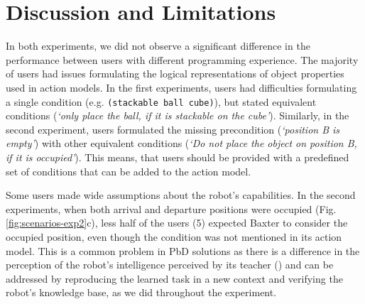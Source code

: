 





\section{Discussion and Limitations}
In both experiments, we did not observe a significant difference in the performance between users with different programming experience. 
The majority of users had issues formulating the logical representations of object properties used in action models. In the first experiments, users had difficulties formulating a single condition (e.g. \texttt{(stackable ball cube)}), but stated equivalent conditions (\textit{`only place the ball, if it is stackable on the cube'}).
Similarly, in the second experiment, users formulated the missing precondition (\textit{`position B is empty'}) with other equivalent conditions (\textit{`Do not place the object on position B, if it is occupied'}). This means, that users should be provided with a predefined set of conditions that can be added to the action model.

Some users made wide assumptions about the robot's capabilities. In the second experiments, when both arrival and departure positions were occupied (Fig. \ref{fig:scenarios-exp2}c), less half of the users (5) expected Baxter to consider the occupied position, even though the condition was not mentioned in its action model.
This is a common problem in PbD solutions as there is a difference in the perception of the robot's intelligence perceived by its teacher (\cite{suay2012practical}) and can be addressed by reproducing the learned task in a new context and verifying the robot's knowledge base, as we did throughout the experiment.

